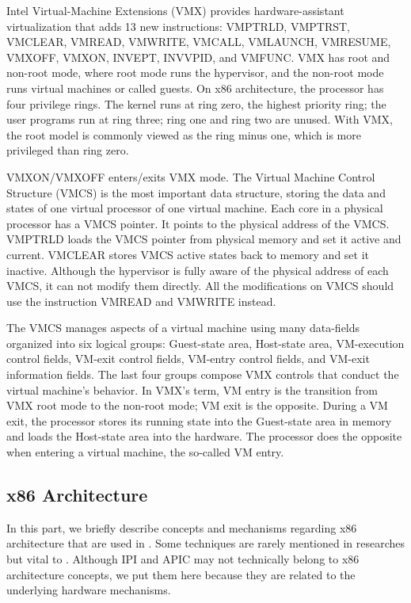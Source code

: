 Intel Virtual-Machine Extensions (VMX) provides hardware-assistant virtualization that adds 13 new instructions: VMPTRLD, VMPTRST, VMCLEAR, VMREAD, VMWRITE, VMCALL, VMLAUNCH, VMRESUME, VMXOFF, VMXON, INVEPT, INVVPID, and VMFUNC. VMX has root and non-root mode, where root mode runs the hypervisor, and the non-root mode runs virtual machines or called guests. On x86 architecture, the processor has four privilege rings. The kernel runs at ring zero, the highest priority ring; the user programs run at ring three; ring one and ring two are unused. With VMX, the root model is commonly viewed as the ring minus one, which is more privileged than ring zero.

VMXON/VMXOFF enters/exits VMX mode. The Virtual Machine Control Structure (VMCS) is the most important data structure, storing the data and states of one virtual processor of one virtual machine. Each core in a physical processor has a VMCS pointer. It points to the physical address of the VMCS. VMPTRLD loads the VMCS pointer from physical memory and set it active and current. VMCLEAR stores VMCS active states back to memory and set it inactive. Although the hypervisor is fully aware of the physical address of each VMCS, it can not modify them directly. All the modifications on VMCS should use the instruction VMREAD and VMWRITE instead.

The VMCS manages aspects of a virtual machine using many data-fields organized into six logical groups: Guest-state area, Host-state area, VM-execution control fields, VM-exit control fields, VM-entry control fields, and VM-exit information fields. The last four groups compose VMX controls that conduct the virtual machine's behavior. In VMX's term, VM entry is the transition from VMX root mode to the non-root mode; VM exit is the opposite. During a VM exit, the processor stores its running state into the Guest-state area in memory and loads the Host-state area into the hardware. The processor does the opposite when entering a virtual machine, the so-called VM entry.



\subsection{x86 Architecture}

In this part, we briefly describe concepts and mechanisms regarding x86 architecture that are used in \name. Some techniques are rarely mentioned in researches but vital to \name. Although IPI and APIC may not technically belong to x86 architecture concepts, we put them here because they are related to the underlying hardware mechanisms.


